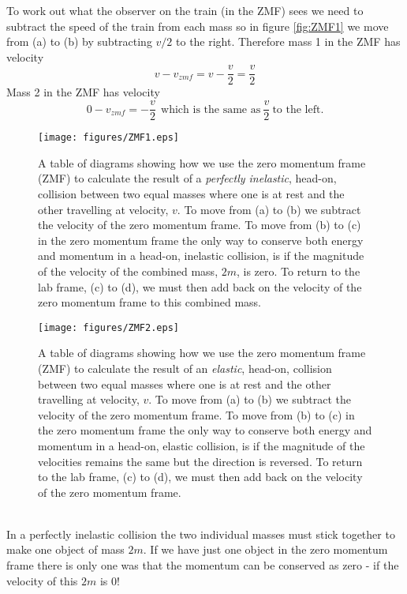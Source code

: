 \noindent To work out what the observer on the train (in the ZMF) sees we need to subtract the speed of the train from each mass so in figure \ref{fig:ZMF1} we move from (a) to (b) by subtracting $v/2$ to the right.  Therefore mass 1 in the ZMF has velocity
\begin{equation}
v-v_{zmf}=v-\frac{v}{2}=\frac{v}{2}
\end{equation}
Mass 2 in the ZMF has velocity
\begin{equation}
0-v_{zmf}=-\frac{v}{2}\ \  \mbox{which is the same as}\ \frac{v}{2}\ \mbox{to the left}.
\end{equation}
\addtocounter{figure}{-1}
\begin{wrapfigure}{r}{9cm}
\texttt{[image: figures/ZMF1.eps]}
\caption{A table of diagrams showing how we use the zero momentum frame (ZMF) to calculate the result of a {\it perfectly inelastic}, head-on, collision between two equal masses where one is at rest and the other travelling at velocity, $v$.  To move from (a) to (b) we subtract the velocity of the zero momentum frame.  To move from (b) to (c) in the zero momentum frame the only way to conserve both energy and momentum in a head-on, inelastic collision, is if the magnitude of the velocity of the combined mass, $2m$, is zero.  To return to the lab frame, (c) to (d), we must then add back on the velocity of the zero momentum frame to this combined mass.}\vspace{0.5cm}
\label{fig:ZMF1}
\texttt{[image: figures/ZMF2.eps]}
\caption{A table of diagrams showing how we use the zero momentum frame (ZMF) to calculate the result of an {\it elastic}, head-on, collision between two equal masses where one is at rest and the other travelling at velocity, $v$.  To move from (a) to (b) we subtract the velocity of the zero momentum frame.  To move from (b) to (c) in the zero momentum frame the only way to conserve both energy and momentum in a head-on, elastic collision, is if the magnitude of the velocities remains the same but the direction is reversed.  To return to the lab frame, (c) to (d), we must then add back on the velocity of the zero momentum frame.} 
\label{fig:ZMF2} 
\end{wrapfigure}
\\
\noindent In a perfectly inelastic collision the two individual masses must stick together to make one object of mass $2m$.  If we have just one object in the zero momentum frame there is only one was that the momentum can be conserved as zero - if the velocity of this $2m$ is $ 0$! \\
